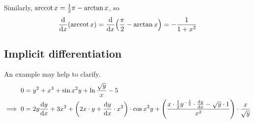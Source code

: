 Similarly, \(\arccot x = \frac 12 \pi - \arctan x\), so
\begin{equation*}
\dv{x}(\arccot x) = \dv{x}(\frac \pi 2 - \arctan x) = -\frac 1{1 + x^2}
\end{equation*}

\subsection{Implicit differentiation}



An example may help to clarify.
\begin{align*}
0 &= y^2 + x^3 + \sin x^2 y + \ln \frac{\sqrt y} x - 5 \\
\implies 0 &=
            2y \dv{y}{x} + 3x^2 +
            \pqty{2x \cdot y + \dv{y}{x} \cdot x^2} \cdot \cos x^2 y +
            \pqty{\frac{x \cdot \frac 12 y^{-\frac 12} \cdot \dv{y}{x} -
                        \sqrt y \cdot 1}
                       {x^2}} \cdot \frac x{\sqrt y} \\
\end{align*}

